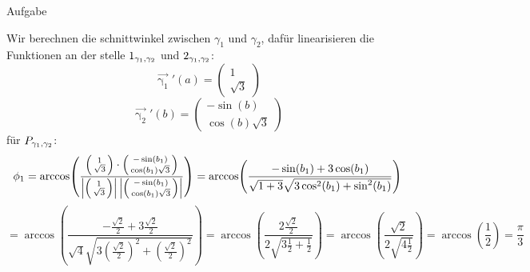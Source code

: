 \documentclass{scrartcl}
\begin{document}
\begin{section}{Aufgabe}
\begin{itemize}
\[\]
Wir berechnen die schnittwinkel zwischen $\gamma_1$ und $\gamma_2$, dafür linearisieren die Funktionen an der stelle $\schnt{\gamma_1}{\gamma_2}{1}$ und $\schnt{\gamma_1}{\gamma_2}{2}$:\\
\[\vec{\upgamma_1}'(a)=\begin{pmatrix}1\\\sqrt{3}\end{pmatrix}\]
\[\vec{\upgamma_2}'(b)=\begin{pmatrix}-\sin(b)\\\cos(b)\sqrt{3}\end{pmatrix}\]
für $\schnt{\gamma_1}{\gamma_2}{P}$:
\[\phi_1=\arccos(\frac{\begin{psmallmatrix}1\\\sqrt{3}\end{psmallmatrix}\cdot \begin{psmallmatrix}-\sin(b_1)\\\cos(b_1)\sqrt{3}\end{psmallmatrix}}{\left|\begin{psmallmatrix}1\\\sqrt{3}\end{psmallmatrix}\right|\left|\begin{psmallmatrix}-\sin(b_1)\\\cos(b_1)\sqrt{3}\end{psmallmatrix}\right|})
=\arccos(\frac{-\sin(b_1)+3\cos(b_1)}{\sqrt{1+3} \sqrt{3 \cos[2](b_1)+\sin[2](b_1)}})\]
\[=\arccos(\frac{-\frac{\sqrt{2}}{2}+3\frac{\sqrt{2}}{2}}{\sqrt{4} \sqrt{3 (\frac{\sqrt{2}}{2})^2+(\frac{\sqrt{2}}{2})^2}})=
\arccos(\frac{2\frac{\sqrt{2}}{2}}{2 \sqrt{3 \frac{1}{2}+\frac{1}{2}}})
=\arccos(\frac{\sqrt{2}}{2 \sqrt{4\frac{1}{2}}})
=\arccos(\frac{1}{2})=\frac{\pi}{3}\]


\end{itemize}
\end{section}
\end{document}
